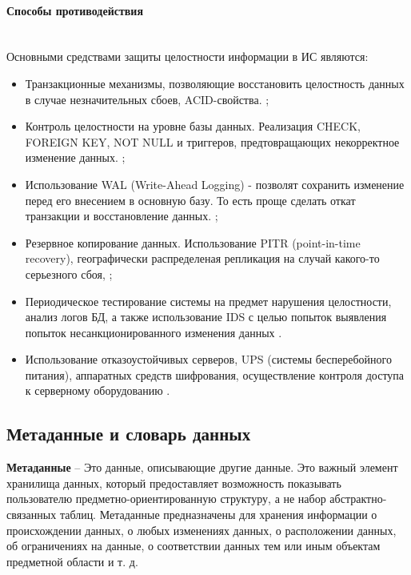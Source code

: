\paragraph{Способы противодействия} ~\\

Основными средствами защиты целостности информации в ИС являются:
\begin{itemize}
    \item Транзакционные механизмы, позволяющие восстановить целостность данных в случае незначительных сбоев, ACID-свойства. \autocite{worksol1, DBtest};
    \item Контроль целостности на уровне базы данных. Реализация CHECK, FOREIGN KEY, NOT NULL и триггеров, предтовращающих некорректное изменение данных. \autocite{flenovinfo};
    \item Использование WAL (Write-Ahead Logging) - позволят сохранить изменение перед его внесением в основную базу. То есть проще сделать откат транзакции и восстановление данных. \autocite{WALintro};
    \item Резервное копирование данных. Использование PITR (point-in-time recovery), географически распределеная репликация на случай какого-то серьезного сбоя, \autocite{PITRintro};
    \item Периодическое тестирование системы на предмет нарушения целостности, анализ логов БД, а также использование IDS с целью попыток выявления попыток несанкционированного изменения данных \autocite{DBtest}.
    \item Использование отказоустойчивых серверов, UPS (системы бесперебойного питания), аппаратных средств шифрования, осуществление контроля доступа к серверному оборудованию \autocite{tolerance1, tolerance2}.

\end{itemize}

\subsection{Метаданные и словарь данных}

\begin{grayquote}
	\textbf{Метаданные} -- Это данные, описывающие другие данные. Это важный элемент хранилища данных, который предоставляет возможность показывать пользователю предметно-ориентированную структуру, а не набор абстрактно-связанных таблиц. Метаданные предназначены для хранения информации о происхождении данных, о любых изменениях данных, о расположении данных, об ограничениях на данные, о соответствии данных тем или иным объектам предметной области и т. д. \autocite{Pirogov2009}
\end{grayquote}

